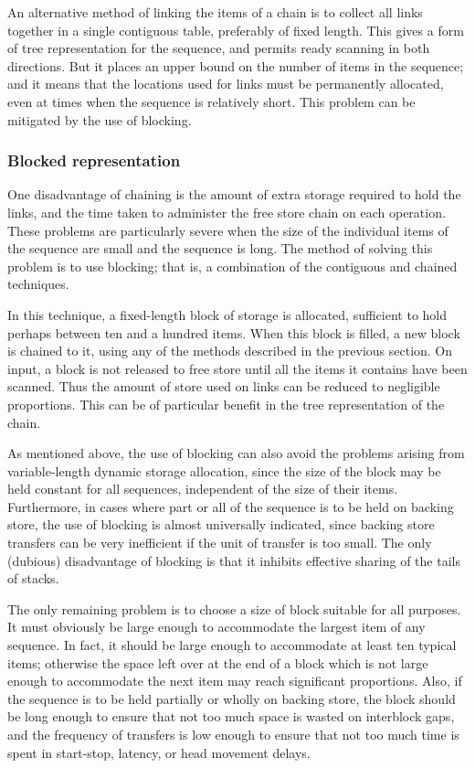 An alternative method of linking the items of a chain is to collect all links together in a single contiguous table, preferably of fixed length. This gives a form of tree representation for the sequence, and permits ready scanning in both directions. But it places an upper bound on the number of items in the sequence; and it means that the locations used for links must be permanently allocated, even at times when the sequence is relatively short. This problem can be mitigated by the use of blocking.

\subsubsection{Blocked representation}

One disadvantage of chaining is the amount of extra storage required to hold the links, and the time taken to administer the free store chain on each operation. These problems are particularly severe when the size of the individual items of the sequence are small and the sequence is long. The method of solving this problem is to use blocking; that is, a combination of the contiguous and chained techniques.

In this technique, a fixed-length block of storage is allocated, sufficient to hold perhaps between ten and a hundred items. When this block is filled, a new block is chained to it, using any of the methods described in the previous section. On input, a block is not released to free store until all the items it contains have been scanned. Thus the amount of store used on links can be reduced to negligible proportions. This can be of particular benefit in the tree representation of the chain.

As mentioned above, the use of blocking can also avoid the problems arising from variable-length dynamic storage allocation, since the size of the block may be held constant for all sequences, independent of the size of their items. Furthermore, in cases where part or all of the sequence is to be held on backing store, the use of blocking is almost universally indicated, since backing store transfers can be very inefficient if the unit of transfer is too small. The only (dubious) disadvantage of blocking is that it inhibits effective sharing of the tails of stacks.

The only remaining problem is to choose a size of block suitable for all purposes. It must obviously be large enough to accommodate the largest item of any sequence. In fact, it should be large enough to accommodate at least ten typical items; otherwise the space left over at the end of a block which is not large enough to accommodate the next item may reach significant proportions. Also, if the sequence is to be held partially or wholly on backing store, the block should be long enough to ensure that not too much space is wasted on interblock gaps, and the frequency of transfers is low enough to ensure that not too much time is spent in start-stop, latency, or head movement delays.

